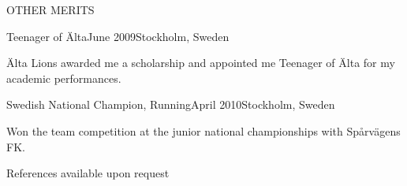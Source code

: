 \documentclass{resume} %
\begin{document}
\begin{rSection}{OTHER MERITS}

\begin{rSubsection}{Teenager of Älta}{June 2009}{}{Stockholm, Sweden}
\item Älta Lions awarded me a scholarship and appointed me Teenager of Älta for my academic performances.
\end{rSubsection}

\begin{rSubsection}{Swedish National Champion, Running}{April 2010}{}{Stockholm, Sweden}
\item Won the team competition at the junior national championships with Spårvägens FK.
\end{rSubsection}


References available upon request
\end{rSection}




\end{document}
